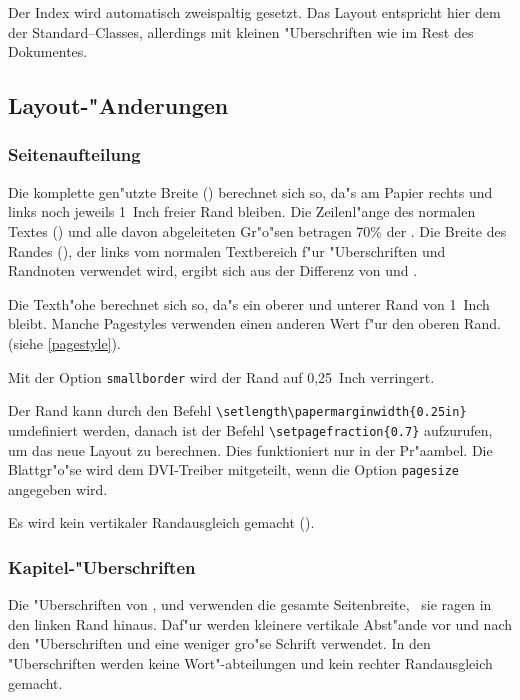 Der Index wird automatisch zweispaltig gesetzt. Das Layout entspricht 
hier dem der Standard--Classes, allerdings mit kleinen "Uberschriften 
wie im Rest des Dokumentes.

\subsection{Layout-"Anderungen}

\subsubsection{Seitenaufteilung}

 Die
komplette gen"utzte Breite () berechnet sich so, da"s am
Papier rechts und links noch jeweils 1~Inch freier Rand bleiben. Die
Zeilenl"ange des normalen Textes () und alle davon
abgeleiteten Gr"o"sen betragen 70\% der . Die Breite des
Randes (), der links vom normalen Textbereich f"ur
"Uberschriften und Randnoten verwendet wird, ergibt sich aus der
Differenz von  und .

 Die Texth"ohe
berechnet sich so, da"s ein oberer und unterer Rand von 1~Inch bleibt.
Manche Pagestyles verwenden einen anderen Wert f"ur den oberen Rand.
(siehe \ref{pagestyle}).

Mit der Option \texttt{smallborder} wird der Rand auf 0,25~Inch verringert.

Der Rand kann durch den Befehl
\verb|\setlength\papermarginwidth|\verb|{0.25in}| umdefiniert werden,
danach ist der Befehl \verb|\setpagefraction{0.7}| aufzurufen, um das
neue Layout zu berechnen. Dies funktioniert nur in der Pr"aambel. Die
Blattgr"o"se wird dem DVI-Treiber mitgeteilt, wenn die Option
\texttt{pagesize} angegeben wird. 

Es wird kein vertikaler Randausgleich gemacht ().

\subsubsection{Kapitel-"Uberschriften}

Die "Uberschriften von ,  und
 verwenden die gesamte Seitenbreite, \dH\ sie ragen in
den linken Rand hinaus. Daf"ur werden kleinere vertikale Abst"ande vor
und nach den "Uberschriften und eine weniger gro"se Schrift verwendet.
In den "Uberschriften werden keine Wort"-abteilungen und kein rechter
Randausgleich gemacht.


